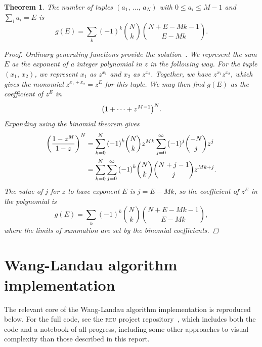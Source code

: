 \documentclass[aps,reprint,floatfix]{revtex4-2}
\theoremstyle{plain}
\newtheorem{thm}{Theorem}[section]
\theoremstyle{definition}
\renewcommand\leq\leqslant%
\begin{document}
\begin{thm}\label{thm:bw-g}
  The number of tuples $(a_1,\, \ldots,\, a_N)$ with $0 \leq a_i \leq M - 1$ and
  $\sum_i a_i = E$ is
  \[
    g(E)
    = \sum_k {(-1)}^k \binom{N}{k} \binom{N + E - Mk - 1}{E - Mk}.
  \]
  \begin{proof}
    Ordinary generating functions provide the solution~\cite{genfunc}. We represent the sum $E$
    as the exponent of a integer polynomial in $z$ in the following way. For the
    tuple $(x_1,\, x_2)$, we represent $x_1$ as $z^{x_1}$ and $x_2$ as
    $z^{x_2}$. Together, we have $z^{x_1} z^{x_2}$, which gives the monomial
    $z^{x_1 + x_2} = z^E$ for this tuple. We may then find $g(E)$ as the
    coefficient of $z^E$ in
    \[
      {\qty(1 + \cdots + z^{M-1})}^N.
    \]
    Expanding using the binomial theorem gives
    \begin{align}
      {\qty(\frac{1 - z^M}{1 - z})}^N
      &= \sum_{k=0}^N {(-1)}^k \binom{N}{k} z^{Mk}
      \sum_{j=0}^\infty {(-1)}^j \binom{-N}{j} z^j \\
      &= \sum_{k=0}^N \sum_{j=0}^\infty {(-1)}^k \binom{N}{k}
      \binom{N + j - 1}{j} z^{Mk + j}.
    \end{align}
    The value of $j$ for $z$ to have exponent $E$ is $j = E - Mk$, so the
    coefficient of $z^E$ in the polynomial is
    \begin{equation}
      g(E)
      = \sum_k {(-1)}^k \binom{N}{k} \binom{N + E - Mk - 1}{E - Mk},
    \end{equation}
    where the limits of summation are set by the binomial coefficients.
  \end{proof}
\end{thm}

\section{Wang-Landau algorithm implementation}\label{sec:wanglandau-core}

The relevant core of the Wang-Landau algorithm implementation is reproduced
below. For the full code, see the \textsc{reu} project
repository~\cite{rpi-reu-notebook}, which includes both the code and a notebook
of all progress, including some other approaches to visual complexity than those
described in this report.

\inputminted{python}{wanglandau-core.py}

\hypersetup{urlcolor=Mahogany}
\renewcommand*{\bibfont}{\small}

\end{document}
